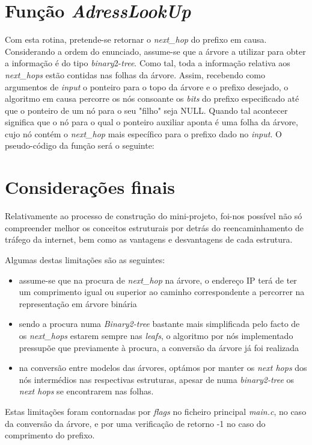 \documentclass[twocolumn]{article}
\begin{document}
\section{Função \textit{AdressLookUp}}
Com esta rotina, pretende-se retornar o \textit{next\_hop} do prefixo em causa. Considerando a ordem do enunciado, assume-se que a árvore a utilizar para obter a informação é do tipo \textit{binary}2-\textit{tree}. Como tal, toda a informação relativa aos \textit{next\_hops} estão contidas nas folhas da árvore. Assim, recebendo como argumentos de \textit{input} o ponteiro para o topo da árvore e o prefixo desejado, o algoritmo em causa percorre os nós consoante os \textit{bits} do prefixo especificado até que o ponteiro de um nó para o seu "filho" seja NULL. Quando tal acontecer significa que o nó para o qual o ponteiro auxiliar aponta é uma folha da árvore, cujo nó contém o \textit{next\_hop} mais específico para o prefixo dado no \textit{input}.
O pseudo-código da função será o seguinte:
\begin{algorithmic}
 	\Return $-1\;$
 \EndIf
 
 \State $auxiliar:=root\;$
 
 		\If{$has\_no\_"0"\_child$}{
 			\Return $auxiliar \rightarrow next\_hop\;$
 		\EndIf
 		\State $auxiliar:=auxiliar \rightarrow zero\;$
 	\Else
 		\If{$has\_no\_"1"\_child$}
 			\Return $auxiliar \rightarrow next\_hop\;$
 		\EndIf
 		\State $auxiliar:=auxiliar \rightarrow one\;$
 	\EndIf
 \EndWhile
 
 \Return -1\;
 \caption{AdressLookUp}
\end{algorithmic}
\section{Considerações finais}
Relativamente ao processo de construção do mini-projeto, foi-nos possível não só compreender melhor os conceitos estruturais por detrás do reencaminhamento de tráfego da internet, bem como as vantagens e desvantagens de cada estrutura.

Algumas destas limitações são as seguintes:
\begin{itemize}
  \item assume-se que na procura de \textit{next\_hop} na árvore, o endereço IP terá de ter um comprimento igual ou superior ao caminho correspondente a percorrer na representação em árvore binária
  
  \item sendo a procura numa \textit{Binary2-tree} bastante mais simplificada pelo facto de os \textit{next\_hops} estarem sempre nas \textit{leafs}, o algoritmo por nós implementado pressupõe que previamente à procura, a conversão da árvore já foi realizada
  \item na conversão entre modelos das árvores, optámos por manter os \textit{next hops} dos nós intermédios nas respectivas estruturas, apesar de numa \textit{binary2-tree} os \textit{next hops} se encontrarem nas folhas.
  \end{itemize}
Estas limitações foram contornadas por \textit{flags} no ficheiro principal \textit{main.c}, no caso da conversão da árvore, e por uma verificação de retorno -1 no caso do comprimento do prefixo.
\end{document}
